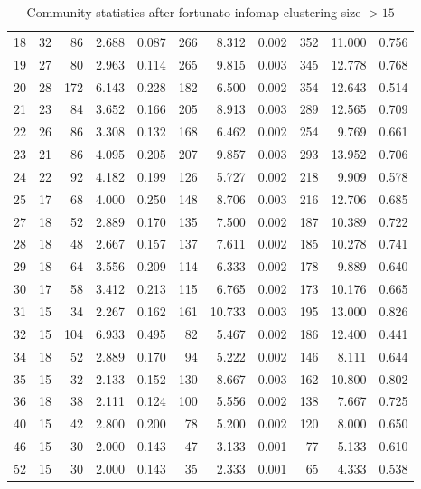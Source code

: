 \begin{table}[ht]
\begin{adjustbox}{max width=\textwidth}
\begin{tabular}{lrrrrrrrrrr}
  18 & 32 & 86 & 2.688 & 0.087 & 266 & 8.312 & 0.002 & 352 & 11.000 & 0.756 \\ 
  19 & 27 & 80 & 2.963 & 0.114 & 265 & 9.815 & 0.003 & 345 & 12.778 & 0.768 \\ 
  20 & 28 & 172 & 6.143 & 0.228 & 182 & 6.500 & 0.002 & 354 & 12.643 & 0.514 \\ 
  21 & 23 & 84 & 3.652 & 0.166 & 205 & 8.913 & 0.003 & 289 & 12.565 & 0.709 \\ 
  22 & 26 & 86 & 3.308 & 0.132 & 168 & 6.462 & 0.002 & 254 & 9.769 & 0.661 \\ 
  23 & 21 & 86 & 4.095 & 0.205 & 207 & 9.857 & 0.003 & 293 & 13.952 & 0.706 \\ 
  24 & 22 & 92 & 4.182 & 0.199 & 126 & 5.727 & 0.002 & 218 & 9.909 & 0.578 \\ 
  25 & 17 & 68 & 4.000 & 0.250 & 148 & 8.706 & 0.003 & 216 & 12.706 & 0.685 \\ 
  27 & 18 & 52 & 2.889 & 0.170 & 135 & 7.500 & 0.002 & 187 & 10.389 & 0.722 \\ 
  28 & 18 & 48 & 2.667 & 0.157 & 137 & 7.611 & 0.002 & 185 & 10.278 & 0.741 \\ 
  29 & 18 & 64 & 3.556 & 0.209 & 114 & 6.333 & 0.002 & 178 & 9.889 & 0.640 \\ 
  30 & 17 & 58 & 3.412 & 0.213 & 115 & 6.765 & 0.002 & 173 & 10.176 & 0.665 \\ 
  31 & 15 & 34 & 2.267 & 0.162 & 161 & 10.733 & 0.003 & 195 & 13.000 & 0.826 \\ 
  32 & 15 & 104 & 6.933 & 0.495 & 82 & 5.467 & 0.002 & 186 & 12.400 & 0.441 \\ 
  34 & 18 & 52 & 2.889 & 0.170 & 94 & 5.222 & 0.002 & 146 & 8.111 & 0.644 \\ 
  35 & 15 & 32 & 2.133 & 0.152 & 130 & 8.667 & 0.003 & 162 & 10.800 & 0.802 \\ 
  36 & 18 & 38 & 2.111 & 0.124 & 100 & 5.556 & 0.002 & 138 & 7.667 & 0.725 \\ 
  40 & 15 & 42 & 2.800 & 0.200 & 78 & 5.200 & 0.002 & 120 & 8.000 & 0.650 \\ 
  46 & 15 & 30 & 2.000 & 0.143 & 47 & 3.133 & 0.001 & 77 & 5.133 & 0.610 \\ 
  52 & 15 & 30 & 2.000 & 0.143 & 35 & 2.333 & 0.001 & 65 & 4.333 & 0.538 \\ 
   \hline
\end{tabular}
\end{adjustbox}
\caption{Community statistics after fortunato infomap clustering size $> 15$} 
\label{tab:Community statistics after fortunato infomap clustering size > 15}
\end{table}



